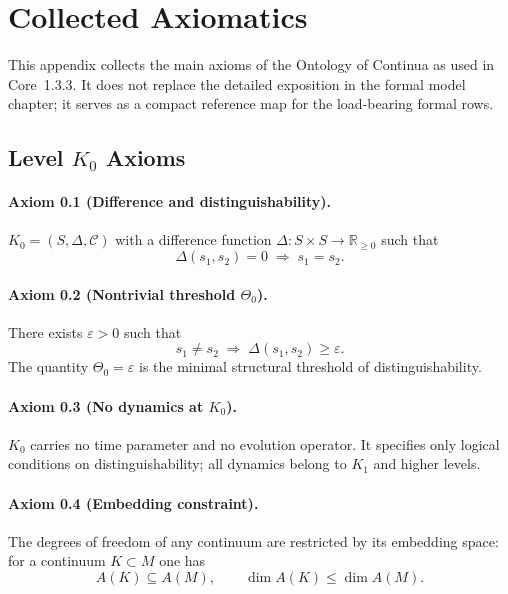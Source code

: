 
\section{Collected Axiomatics}
\label{app:axioms-full}

This appendix collects the main axioms of the Ontology of Continua as used in
Core~1.3.3. It does not replace the detailed exposition in
the formal model chapter; it serves as a compact reference map for the
load-bearing formal rows.

\subsection{Level \texorpdfstring{$K_0$}{K0} Axioms}

\paragraph{Axiom 0.1 (Difference and distinguishability).}
\(K_0 = (S,\Delta,\mathcal{C})\) with a difference function
\(\Delta : S\times S \to \mathbb{R}_{\ge 0}\) such that
\[
  \Delta(s_1,s_2) = 0 \;\Rightarrow\; s_1 = s_2.
\]

\paragraph{Axiom 0.2 (Nontrivial threshold \texorpdfstring{\(\Theta_0\)}{\Theta_0}).}
There exists \(\varepsilon>0\) such that
\[
  s_1\neq s_2 \;\Rightarrow\; \Delta(s_1,s_2)\ge\varepsilon.
\]
The quantity \(\Theta_0=\varepsilon\) is the minimal structural threshold of
distinguishability.

\paragraph{Axiom 0.3 (No dynamics at \texorpdfstring{\(K_0\)}{K_0}).}
\(K_0\) carries no time parameter and no evolution operator.  It specifies only
logical conditions on distinguishability; all dynamics belong to \(K_1\) and
higher levels.

\paragraph{Axiom 0.4 (Embedding constraint).}
The degrees of freedom of any continuum are restricted by its embedding space:
for a continuum \(K\subset M\) one has
\[
  A(K) \subseteq A(M),
  \qquad
  \dim A(K) \le \dim A(M).
\]

